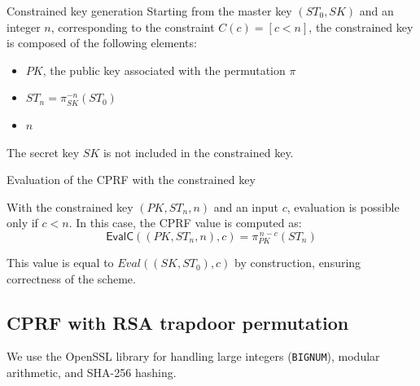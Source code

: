 \documentclass[9pt]{extarticle}
\begin{document}
\begin{defbox}{Constrained key generation}
Starting from the master key $(ST_0, SK)$ and an integer $n$, corresponding to the constraint
$C(c) = [c < n]$, the constrained key is composed of the following elements:
\begin{itemize}
  \item $PK$, the public key associated with the permutation $\pi$
  \item $ST_n = \pi_{SK}^{-n}(ST_0)$
  \item $n$
\end{itemize}

The secret key $SK$ is not included in the constrained key.
\end{defbox}

\begin{defbox}{Evaluation of the CPRF with the constrained key}
    
With the constrained key $(PK, ST_n, n)$ and an input $c$, evaluation is possible only if
$c < n$.
In this case, the CPRF value is computed as:
\[
\textsf{EvalC}((PK, ST_n, n), c) = \pi_{PK}^{\,n-c}(ST_n)
\]

This value is equal to $Eval((SK, ST_0), c)$ by construction, ensuring correctness of the scheme.

\begin{center}
\end{center}

\end{defbox}

\subsection{CPRF with RSA trapdoor permutation}

We use the OpenSSL library for handling large integers
(\texttt{BIGNUM}), modular arithmetic, and SHA-256 hashing.
\end{document}
